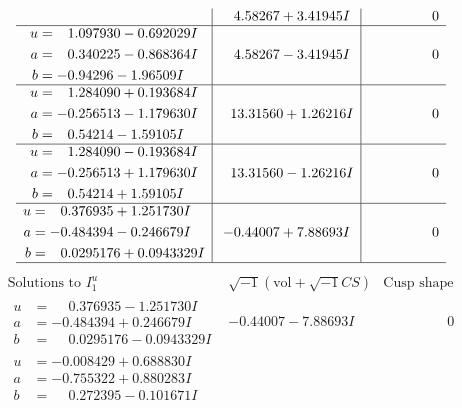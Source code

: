 \documentclass[1p]{elsarticle_modified}
\theoremstyle{definition}
\newcommand{\I}{\sqrt{-1}}
\begin{document}
$$\begin{array}{c|c|c}
 & \phantom{-}4.58267 + 3.41945 I & \phantom{-0.000000 } 0 \\ \hline\begin{aligned}
u &= \phantom{-}1.097930 - 0.692029 I \\
a &= \phantom{-}0.340225 - 0.868364 I \\
b &= -0.94296 - 1.96509 I\end{aligned}
 & \phantom{-}4.58267 - 3.41945 I & \phantom{-0.000000 } 0 \\ \hline\begin{aligned}
u &= \phantom{-}1.284090 + 0.193684 I \\
a &= -0.256513 - 1.179630 I \\
b &= \phantom{-}0.54214 - 1.59105 I\end{aligned}
 & \phantom{-}13.31560 + 1.26216 I & \phantom{-0.000000 } 0 \\ \hline\begin{aligned}
u &= \phantom{-}1.284090 - 0.193684 I \\
a &= -0.256513 + 1.179630 I \\
b &= \phantom{-}0.54214 + 1.59105 I\end{aligned}
 & \phantom{-}13.31560 - 1.26216 I & \phantom{-0.000000 } 0 \\ \hline\begin{aligned}
u &= \phantom{-}0.376935 + 1.251730 I \\
a &= -0.484394 - 0.246679 I \\
b &= \phantom{-}0.0295176 + 0.0943329 I\end{aligned}
 & -0.44007 + 7.88693 I & \phantom{-0.000000 } 0\\
 \hline 
 \end{array}$$\newpage$$\begin{array}{c|c|c}  
\text{Solutions to }I^u_{1}& \I (\text{vol} + \sqrt{-1}CS) & \text{Cusp shape}\\
 \hline 
\begin{aligned}
u &= \phantom{-}0.376935 - 1.251730 I \\
a &= -0.484394 + 0.246679 I \\
b &= \phantom{-}0.0295176 - 0.0943329 I\end{aligned}
 & -0.44007 - 7.88693 I & \phantom{-0.000000 } 0 \\ \hline\begin{aligned}
u &= -0.008429 + 0.688830 I \\
a &= -0.755322 + 0.880283 I \\
b &= \phantom{-}0.272395 - 0.101671 I\end{aligned}

\end{array}$$
\end{document}
